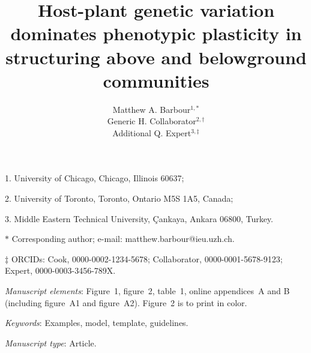 \documentclass[11pt]{article}
\title{Host-plant genetic variation dominates phenotypic plasticity in structuring above and belowground communities}
\author{Matthew A. Barbour$^{1,\ast}$ \\ 
Generic H. Collaborator$^{2,\dag}$ \\ 
Additional Q. Expert$^{3,\ddag}$}
\date{}
\begin{document}
\maketitle

\noindent{}1. University of Chicago, Chicago, Illinois 60637;

\noindent{}2. University of Toronto, Toronto, Ontario M5S 1A5, Canada;

\noindent{}3. Middle Eastern Technical University, \c{C}ankaya, 
Ankara 06800, Turkey.

\noindent{}$\ast$ Corresponding author; e-mail: matthew.barbour@ieu.uzh.ch.

\noindent{}$\ddag$ ORCIDs: Cook, 0000-0002-1234-5678; Collaborator, 0000-0001-5678-9123; Expert, 0000-0003-3456-789X.

\bigskip

\textit{Manuscript elements}: Figure~1, figure~2, table~1, online
appendices~A and B (including figure~A1 and figure~A2). Figure~2 is to
print in color.

\bigskip

\textit{Keywords}: Examples, model, template, guidelines.

\bigskip

\textit{Manuscript type}: Article. 

\bigskip


\linenumbers{}
\modulolinenumbers[3]

\newpage{}
\end{document}

